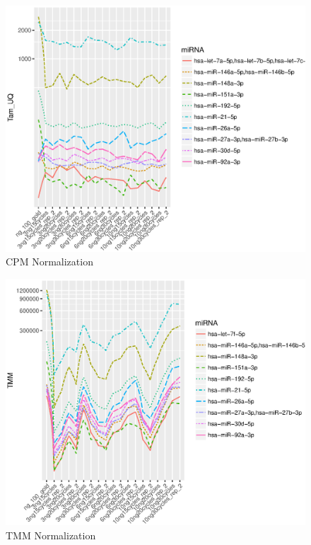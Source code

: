 \documentclass{bioinfo}
\begin{document}
\begin{figure}[!tpb]
\centerline{\includegraphics[scale=0.7]{fig-3-tamuq.eps}}
\caption{CPM Normalization}\label{fig:3}
\end{figure} 



\begin{figure}[!tpb]
\centerline{\includegraphics[scale=0.7]{fig-4-tmm.eps}}
\caption{TMM Normalization}\label{fig:4}
\end{figure} 
\end{document}
